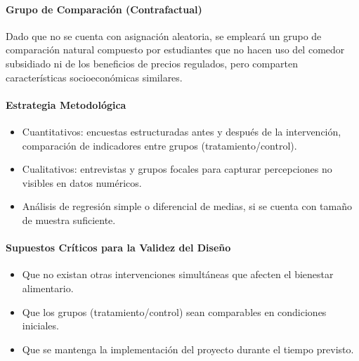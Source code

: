 \documentclass[letterpaper, 11pt]{report}
\begin{document}
\paragraph{Grupo de Comparación (Contrafactual)}
Dado que no se cuenta con asignación aleatoria, se empleará un grupo de comparación natural compuesto por estudiantes que no hacen uso del comedor subsidiado ni de los beneficios de precios regulados, pero comparten características socioeconómicas similares.

\paragraph{Estrategia Metodológica}
\begin{itemize}
      \item Cuantitativos: encuestas estructuradas antes y después de la intervención, comparación de indicadores entre grupos (tratamiento/control).
      \item Cualitativos: entrevistas y grupos focales para capturar percepciones no visibles en datos numéricos.
      \item Análisis de regresión simple o diferencial de medias, si se cuenta con tamaño de muestra suficiente.
\end{itemize}

\paragraph{Supuestos Críticos para la Validez del Diseño}
\begin{itemize}
      \item Que no existan otras intervenciones simultáneas que afecten el bienestar alimentario.
      \item Que los grupos (tratamiento/control) sean comparables en condiciones iniciales.
      \item Que se mantenga la implementación del proyecto durante el tiempo previsto.
\end{itemize}
\end{document}
